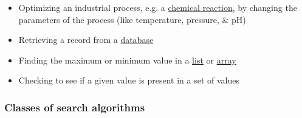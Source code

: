 \documentclass{article}
\begin{document}
\begin{itemize}
	\item Optimizing an industrial process, e.g. a \href{https://en.wikipedia.org/wiki/Chemical_reaction}{chemical reaction}, by changing the parameters of the process (like temperature, pressure, \& pH)
	\item Retrieving a record from a \href{https://en.wikipedia.org/wiki/Database}{database}
	\item Finding the maximum or minimum value in a \href{https://en.wikipedia.org/wiki/List_(abstract_data_type)}{list} or \href{https://en.wikipedia.org/wiki/Array_data_structure}{array}
	\item Checking to see if a given value is present in a set of values
\end{itemize}


\subsubsection{Classes of search algorithms}
\end{document}
